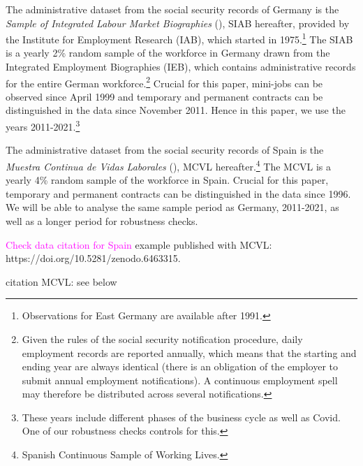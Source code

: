 \documentclass[12pt]{article}
\theoremstyle{definition}
\theoremstyle{remark}
\begin{document}
The administrative dataset from the social security records of Germany is the \emph{Sample of Integrated Labour Market Biographies} (\cite*{SIAB}), SIAB hereafter, provided by the Institute for Employment Research (IAB), which started in 1975.\footnote{Observations for East Germany are available after 1991.} 
The SIAB is a yearly 2\% random sample of the workforce in Germany drawn from the Integrated Employment Biographies (IEB), 
which contains administrative records for the entire German workforce.\footnote{Given the rules of the social security notification procedure, daily employment records are reported annually, which means that the starting and ending year are always identical (there is an obligation of the employer to submit annual employment notifications). A continuous employment spell may therefore be distributed across several notifications.} 
Crucial for this paper, 
mini-jobs can be observed since April 1999 and  temporary and permanent 
contracts can be distinguished in the data since November 2011. Hence in this paper, we use the years 2011-2021.\footnote{These years include different phases of the business cycle as well as Covid. One of our robustness checks controls for this.} 

The administrative dataset from the social security records of Spain is the \emph{Muestra Continua de Vidas Laborales} (\cite*{MCVL}), MCVL hereafter.\footnote{Spanish Continuous Sample of Working Lives.} 
The MCVL is a yearly 4\% random sample of the workforce in Spain.
Crucial for this paper, temporary and permanent contracts can be
distinguished in the data since 1996. We will be able to analyse the same sample period as Germany, 2011-2021, as well as a longer period for robustness checks.

\textcolor{magenta}{Check data citation for Spain} 
example published with MCVL:
https://doi.org/10.5281/zenodo.6463315.

citation MCVL: see below
\end{document}
